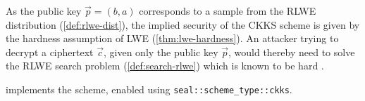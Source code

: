 As the public key $\vec{p} = (b, a)$ corresponds to a sample from the RLWE distribution (\cref{def:rlwe-dist}), the implied security of the CKKS scheme is given by the hardness assumption of LWE (\cref{thm:lwe-hardness}).
An attacker trying to decrypt a ciphertext $\vec{c}$, given only the public key $\vec{p}$, would thereby need to solve the RLWE search problem (\cref{def:search-rlwe}) which is known to be hard \parencite{2010-rlwe-original}.

\cite{seal-4.0} implements the scheme, enabled using \texttt{seal::scheme\_type::ckks}.
